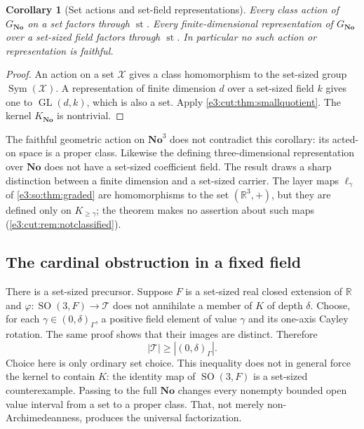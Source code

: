 \documentclass[11pt,letterpaper]{article}
\numberwithin{equation}{section}
\newtheorem{corollary}[corollary]{Corollary}
\theoremstyle{definition}
\theoremstyle{remark}
\newcommand{\No}{\mathbf{No}}
\newcommand{\R}{\mathbb R}
\newcommand{\st}{\operatorname{st}}
\newcommand{\SO}{\operatorname{SO}}
\newcommand{\GL}{\operatorname{GL}}
\newcommand{\Sym}{\operatorname{Sym}}
\begin{document}
\begin{corollary}[Set actions and set-field representations]\label{e3:cut:cor:actions}
Every class action of $G_{\No}$ on a set factors through $\st$. Every
finite-dimensional representation of $G_{\No}$ over a set-sized field factors
through $\st$. In particular no such action or representation is faithful.
\end{corollary}
\begin{proof}
An action on a set $\mathcal X$ gives a class homomorphism to the set-sized group
$\Sym(\mathcal X)$. A representation of finite dimension $d$ over a set-sized
field $k$ gives one to $\GL(d,k)$, which is also a set. Apply
\cref{e3:cut:thm:smallquotient}. The kernel $K_{\No}$ is nontrivial.
\end{proof}

The faithful geometric action on $\No^3$ does not contradict this corollary: its
acted-on space is a proper class. Likewise the defining three-dimensional
representation over $\No$ does not have a set-sized coefficient field. The
result draws a sharp distinction between a finite dimension and a set-sized
carrier. The layer maps $\ell_\gamma$ of \cref{e3:so:thm:graded} are
homomorphisms to the set $(\R^3,+)$, but they are defined only on
$K_{\ge\gamma}$; the theorem makes no assertion about such maps
(\cref{e3:cut:rem:notclassified}).

\subsection{The cardinal obstruction in a fixed field}

There is a set-sized precursor. Suppose $F$ is a set-sized real closed
extension of $\R$ and $\varphi:\SO(3,F)\to\mathcal T$ does not annihilate a
member of $K$ of depth $\delta$. Choose, for each $\gamma\in(0,\delta)_\Gamma$,
a positive field element of value $\gamma$ and its one-axis Cayley rotation.
The same proof shows that their images are distinct. Therefore
\begin{equation}\label{e3:cut:eq:cardbound}
 |\mathcal T|\ge|(0,\delta)_\Gamma|.
\end{equation}
Choice here is only ordinary set choice. This inequality does not in general
force the kernel to contain $K$: the identity map of $\SO(3,F)$ is a set-sized
counterexample. Passing to the full $\No$ changes every nonempty bounded open
value interval from a set to a proper class. That, not merely
non-Archimedeanness, produces the universal factorization.
\end{document}
